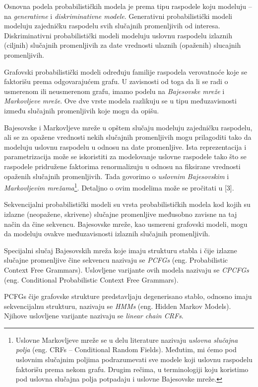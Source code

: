 \documentclass[a4paper, 12pt]{article}
\begin{document}
Osnovna podela probabilističkih modela je prema tipu raspodele koju modeluju -- na \textit{generativne} i \textit{diskriminativne modele}. Generativni probabilistički modeli modeluju zajedničku raspodelu svih slučajnih promenljivih od interesa. Diskriminativni probabilistički modeli modeluju uslovnu raspodelu izlaznih (ciljnih) slučajnih promenljivih za date vrednosti ulaznih (opaženih) slucajnih promenljivih.

Grafovski probabilistički modeli određuju familije raspodela verovatnoće koje se faktorišu prema odgovarajućem grafu. U zavisnosti od toga da li se radi o usmerenom ili neusmerenom grafu, imamo podelu na \textit{Bajesovske mreže} i \textit{Markovljeve mreže}. Ove dve vrste modela razlikuju se u tipu međuzavisnosti između slučajnih promenljivih koje mogu da opišu. 

Bajesovske i Markovljeve mreže u opštem slučaju modeluju zajedničku raspodelu, ali se za opažene vrednosti nekih slučajnih promenljivih mogu prilagoditi tako da modeluju uslovnu raspodelu u odnosu na date promenljive. Ista reprezentacija i parametrizacija može se iskoristiti za modelovanje uslovne raspodele tako što se raspodele pridružene faktorima renormalizuju u odnosu na fiksirane vrednosti opaženih slučajnih promenljivih. Tada govorimo o \textit{uslovnim Bajesovskim} i \textit{Markovljevim mrežama}\footnote{Uslovne Markovljeve mreže se u delu literature nazivaju \textit{uslovna slučajna polja} (eng. CRFs -- Conditional Random Fields). Međutim, mi ćemo pod uslovnim slučajnim poljima podrazumevati sve modele koji uslovnu raspodelu faktorišu prema nekom grafu. Drugim rečima, u terminologiji koju koristimo pod uslovna slučajna polja potpadaju i uslovne Bajesovske mreže.}. Detaljno o ovim modelima može se pročitati u [3].

Sekvencijalni probabilistički modeli su vrsta probabilističkih modela kod kojih su izlazne (neopažene, skrivene) slučajne promenljive međusobno zavisne na taj način da čine sekvencu. Bajesovske mreže, kao usmereni grafovski modeli, mogu da modeluju ovakve međuzavisnosti izlaznih slučajnih promenljivih. 

Specijalni slučaj Bajesovskih mreža koje imaju strukturu stabla i čije izlazne slučajne promenljive čine sekvencu nazivaju se \textit{PCFGs} (eng. Probabilistic Context Free Grammars). Uslovljene varijante ovih modela nazivaju se \textit{CPCFGs} (eng. Conditional Probabilistic Context Free Grammars). 

PCFGs čije grafovske strukture predstavljaju degenerisano stablo, odnosno imaju sekvencijalnu strukturu, nazivaju se \textit{HMMs} (eng. Hidden Markov Models). Njihove uslovljene varijante nazivaju se \textit{linear chain CRFs}.
\end{document}
